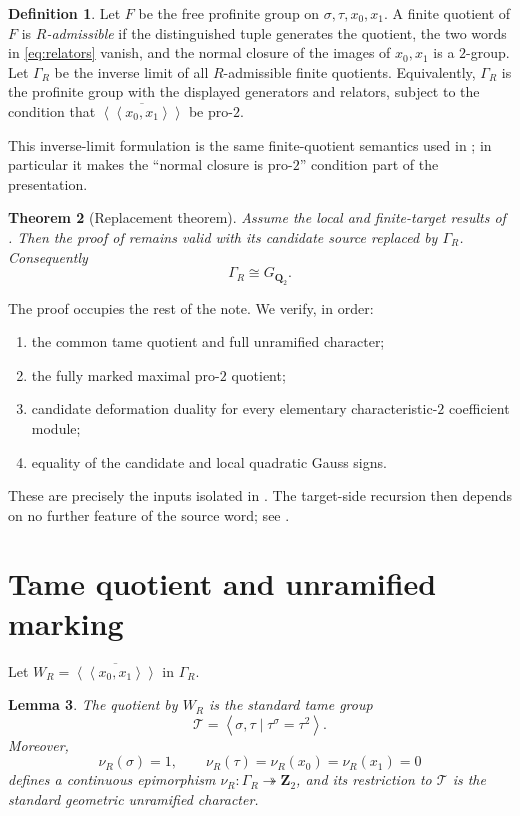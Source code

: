 \documentclass[11pt]{article}
\numberwithin{equation}{section}
\newtheorem{theorem}{Theorem}[section]
\newtheorem{lemma}[theorem]{Lemma}
\theoremstyle{definition}
\newtheorem{definition}[theorem]{Definition}
\theoremstyle{remark}
\newcommand{\Q}{\mathbf Q}
\newcommand{\Z}{\mathbf Z}
\newcommand{\GQ}{G_{\Q_2}}
\newcommand{\GammaR}{\Gamma_R}
\newcommand{\TR}{\mathcal T}
\newcommand{\nuR}{\nu_R}
\newcommand{\angles}[1]{\left\langle #1\right\rangle}
\newcommand{\normalclosure}[1]{\overline{\left\langle\!\left\langle #1
  \right\rangle\!\right\rangle}}
\begin{document}
\begin{definition}\label{def:GammaR}
Let \(F\) be the free profinite group on
\(\sigma,\tau,x_0,x_1\).  A finite quotient of \(F\) is
\emph{\(R\)-admissible} if the distinguished tuple generates the quotient,
the two words in \cref{eq:relators} vanish, and the normal closure of the
images of \(x_0,x_1\) is a \(2\)-group.  Let \(\GammaR\) be the inverse limit
of all \(R\)-admissible finite quotients.  Equivalently, \(\GammaR\) is the
profinite group with the displayed generators and relators, subject to the
condition that \(\normalclosure{x_0,x_1}\) be pro-\(2\).
\end{definition}

This inverse-limit formulation is the same finite-quotient semantics used in
\cite[\S2]{RT}; in particular it makes the ``normal closure is pro-\(2\)''
condition part of the presentation.

\begin{theorem}[Replacement theorem]\label{thm:main}
Assume the local and finite-target results of \cite{RT}.  Then the proof of
\cite[Theorem~1.2]{RT} remains valid with its candidate source replaced by
\(\GammaR\).  Consequently
\[
  \boxed{\GammaR\cong\GQ}.
\]
\end{theorem}

The proof occupies the rest of the note.  We verify, in order:
\begin{enumerate}
  \item the common tame quotient and full unramified character;
  \item the fully marked maximal pro-\(2\) quotient;
  \item candidate deformation duality for every elementary
        characteristic-\(2\) coefficient module;
  \item equality of the candidate and local quadratic Gauss signs.
\end{enumerate}
These are precisely the inputs isolated in
\cite[Corollary~6.19]{RT}.  The target-side recursion then depends on no
further feature of the source word; see \cite[Theorem~8.17]{RT}.

\section{Tame quotient and unramified marking}

Let \(W_R=\normalclosure{x_0,x_1}\) in \(\GammaR\).

\begin{lemma}\label{lem:tame}
The quotient by \(W_R\) is the standard tame group
\[
  \TR=\angles{\sigma,\tau\mid \tau^\sigma=\tau^2}.
\]
Moreover,
\[
  \nuR(\sigma)=1,\qquad
  \nuR(\tau)=\nuR(x_0)=\nuR(x_1)=0
\]
defines a continuous epimorphism
\(\nuR:\GammaR\twoheadrightarrow\Z_2\), and its restriction to \(\TR\) is
the standard geometric unramified character.
\end{lemma}
\end{document}
